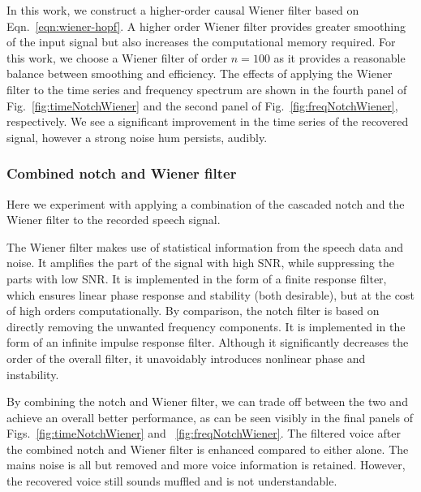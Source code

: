 \documentclass[paper-main.tex]{subfiles}
\begin{document}
In this work, we construct a higher-order causal Wiener filter based on Eqn.~\ref{eqn:wiener-hopf}. A higher order Wiener filter provides greater smoothing of the input signal but also increases the computational memory required. For this work, we choose a Wiener filter of order $n=100$ as it provides a reasonable balance between smoothing and efficiency. The effects of applying the Wiener filter to the time series and frequency spectrum are shown in the fourth panel of Fig.~\ref{fig:timeNotchWiener} and the second panel of Fig.~\ref{fig:freqNotchWiener}, respectively. We see a significant improvement in the time series of the recovered signal, however a strong noise hum persists, audibly. 


\subsubsection{Combined notch and Wiener filter}

Here we experiment with applying a combination of the cascaded notch and the Wiener filter to the recorded speech signal. 


The Wiener filter makes use of statistical information from the speech data and noise. It amplifies the part of the signal with high SNR, while suppressing the parts with low SNR. It is implemented in the form of a finite response filter, which ensures linear phase response and stability (both desirable), but at the cost of high orders computationally. By comparison, the notch filter is based on directly removing the unwanted frequency components. It is implemented in the form of an infinite impulse response filter. Although it significantly decreases the order of the overall filter, it unavoidably introduces nonlinear phase and instability. 


By combining the notch and Wiener filter, we can trade off between the two and achieve an overall better performance, as can be seen visibly in the final panels of Figs.~\ref{fig:timeNotchWiener} and ~\ref{fig:freqNotchWiener}.
The filtered voice after the combined notch and Wiener filter is enhanced compared to either alone. The mains noise is all but removed and more voice information is retained. However, the recovered voice still sounds muffled and is not understandable.
\end{document}
